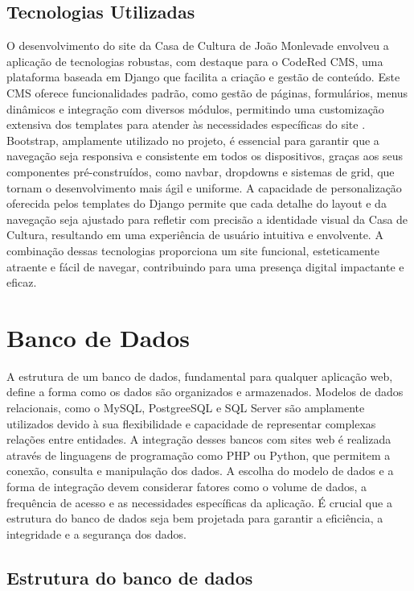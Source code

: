 \subsection{Tecnologias Utilizadas}

O desenvolvimento do site da Casa de Cultura de João Monlevade envolveu a aplicação de tecnologias robustas, com destaque para o CodeRed CMS, uma plataforma baseada em Django que facilita a criação e gestão de conteúdo. Este CMS oferece funcionalidades padrão, como gestão de páginas, formulários, menus dinâmicos e integração com diversos módulos, permitindo uma customização extensiva dos templates para atender às necessidades específicas do site \cite{ellis2015coders}. Bootstrap, amplamente utilizado no projeto, é essencial para garantir que a navegação seja responsiva e consistente em todos os dispositivos, graças aos seus componentes pré-construídos, como navbar, dropdowns e sistemas de grid, que tornam o desenvolvimento mais ágil e uniforme. A capacidade de personalização oferecida pelos templates do Django permite que cada detalhe do layout e da navegação seja ajustado para refletir com precisão a identidade visual da Casa de Cultura, resultando em uma experiência de usuário intuitiva e envolvente. A combinação dessas tecnologias proporciona um site funcional, esteticamente atraente e fácil de navegar, contribuindo para uma presença digital impactante e eficaz.


\section{Banco de Dados}

A estrutura de um banco de dados, fundamental para qualquer aplicação web, define a forma como os dados são organizados e armazenados. Modelos de dados relacionais, como o MySQL, PostgreeSQL e SQL Server são amplamente utilizados devido à sua flexibilidade e capacidade de representar complexas relações entre entidades. A integração desses bancos com sites web é realizada através de linguagens de programação como PHP ou Python, que permitem a conexão, consulta e manipulação dos dados. A escolha do modelo de dados e a forma de integração devem considerar fatores como o volume de dados, a frequência de acesso e as necessidades específicas da aplicação. É crucial que a estrutura do banco de dados seja bem projetada para garantir a eficiência, a integridade e a segurança dos dados.

\subsection{Estrutura do banco de dados}

